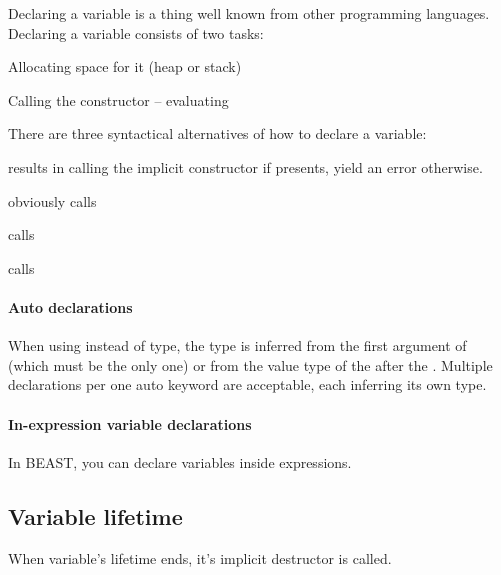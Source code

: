 Declaring a variable is a thing well known from other programming languages. Declaring a variable consists of two tasks:
\begin{compactenum}
	\item Allocating space for it (heap or stack)
	\item Calling the constructor -- evaluating 
\end{compactenum}

There are three syntactical alternatives of how to declare a variable:
\begin{compactitem}
	\item {} results in calling the implicit constructor  if presents, yield an error otherwise.
	\item {} obviously calls 
	\item {} calls 
	\item {} calls  %
\end{compactitem}

\paragraph{Auto declarations}
When using  instead of type, the type is inferred from the first argument of  (which must be the only one) or from the value type of the  after the \kwd{=}. Multiple declarations per one auto keyword are acceptable, each inferring its own type.

\paragraph{In-expression variable declarations}
In BEAST, you can declare variables inside expressions.

\subsection{Variable lifetime}
When variable's lifetime ends, it's implicit destructor  is called.

